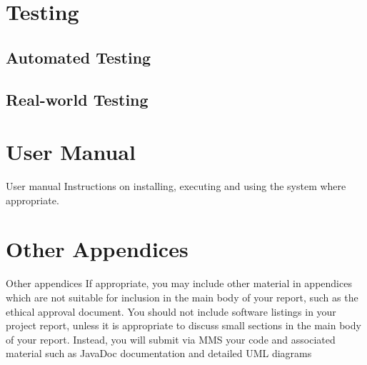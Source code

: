 \documentclass[11pt,a4paper]{report}
\begin{document}
	\section{Testing}
	\subsection{Automated Testing}
	\subsection{Real-world Testing}
	
	\section{User Manual}
	User manual Instructions on installing, executing and using the
	system where appropriate.
	
	\section{Other Appendices}
	Other
	appendices
	If appropriate, you may include other material in
	appendices which are not suitable for inclusion in the
	main body of your report, such as the ethical approval
	document.
	You should not include software listings in your project report, unless it is
	appropriate to discuss small sections in the main body of your report. Instead,
	you will submit via MMS your code and associated material such as JavaDoc
	documentation and detailed UML diagrams
	
\end{document}
